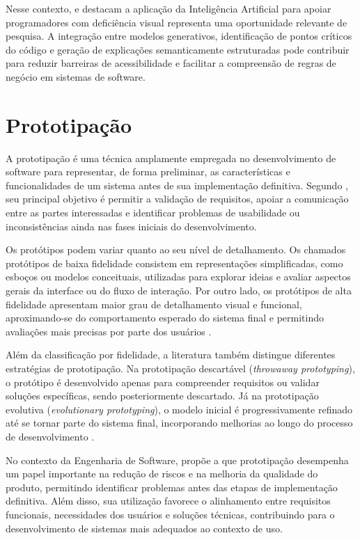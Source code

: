 \documentclass[
    12pt,                   %
    openright,              %
    oneside,                %
    a4paper,                %
    sumario=tradicional,    %
    english,                %
    brazil,                 %
    ]{abntex2}
\begin{document}
Nesse contexto, \textcite{latinoware34224} e \textcite{latinoware40920} destacam a aplicação da Inteligência Artificial para apoiar programadores com deficiência visual representa uma oportunidade relevante de pesquisa. A integração entre modelos generativos, identificação de pontos críticos do código e geração de explicações semanticamente estruturadas pode contribuir para reduzir barreiras de acessibilidade e facilitar a compreensão de regras de negócio em sistemas de software.


\section{Prototipação}\label{sec:Prototipacao}

A prototipação é uma técnica amplamente empregada no desenvolvimento de software para representar, de forma preliminar, as características e funcionalidades de um sistema antes de sua implementação definitiva. Segundo \textcite{latinoware7985}, seu principal objetivo é permitir a validação de requisitos, apoiar a comunicação entre as partes interessadas e identificar problemas de usabilidade ou inconsistências ainda nas fases iniciais do desenvolvimento.

Os protótipos podem variar quanto ao seu nível de detalhamento. Os chamados protótipos de baixa fidelidade consistem em representações simplificadas, como esboços ou modelos conceituais, utilizadas para explorar ideias e avaliar aspectos gerais da interface ou do fluxo de interação. Por outro lado, os protótipos de alta fidelidade apresentam maior grau de detalhamento visual e funcional, aproximando-se do comportamento esperado do sistema final e permitindo avaliações mais precisas por parte dos usuários \cite{latinoware7985}.

Além da classificação por fidelidade, a literatura também distingue diferentes estratégias de prototipação. Na prototipação descartável (\textit{throwaway prototyping}), o protótipo é desenvolvido apenas para compreender requisitos ou validar soluções específicas, sendo posteriormente descartado. Já na prototipação evolutiva (\textit{evolutionary prototyping}), o modelo inicial é progressivamente refinado até se tornar parte do sistema final, incorporando melhorias ao longo do processo de desenvolvimento \cite{latinoware7985}.

No contexto da Engenharia de Software,\textcite{latinoware7985} propõe a que prototipação desempenha um papel importante na redução de riscos e na melhoria da qualidade do produto, permitindo identificar problemas antes das etapas de implementação definitiva. Além disso, sua utilização favorece o alinhamento entre requisitos funcionais, necessidades dos usuários e soluções técnicas, contribuindo para o desenvolvimento de sistemas mais adequados ao contexto de uso.
\end{document}
